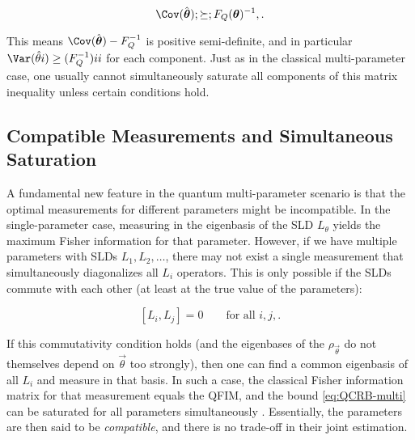 \begin{equation}

\Cov(\hat{\vec{\theta}}) ;\succeq; F_Q(\vec{\theta})^{-1} ,.

\label{eq:QCRB-multi}

\end{equation}

This means $ \Cov(\hat{\vec{\theta}}) - F_Q^{-1}$ is positive semi-definite, and in particular $\Var(\hat{\theta}i) \ge (F_Q^{-1}){ii}$ for each component. Just as in the classical multi-parameter case, one usually cannot simultaneously saturate all components of this matrix inequality unless certain conditions hold.



\subsection{Compatible Measurements and Simultaneous Saturation}



A fundamental new feature in the quantum multi-parameter scenario is that the optimal measurements for different parameters might be incompatible. In the single-parameter case, measuring in the eigenbasis of the SLD $L_\theta$ yields the maximum Fisher information for that parameter. However, if we have multiple parameters with SLDs $L_1, L_2, \ldots$, there may not exist a single measurement that simultaneously diagonalizes all $L_i$ operators. This is only possible if the SLDs commute with each other (at least at the true value of the parameters):

\begin{equation}

[L_i, L_j] = 0 \qquad \text{for all } i,j ,.

\label{eq:SLD-comm}

\end{equation}

If this commutativity condition holds (and the eigenbases of the $\rho_{\vec{\theta}}$ do not themselves depend on $\vec{\theta}$ too strongly), then one can find a common eigenbasis of all $L_i$ and measure in that basis. In such a case, the classical Fisher information matrix for that measurement equals the QFIM, and the bound \eqref{eq:QCRB-multi} can be saturated for all parameters simultaneously \cite{Ragy2016}. Essentially, the parameters are then said to be \textit{compatible}, and there is no trade-off in their joint estimation.



